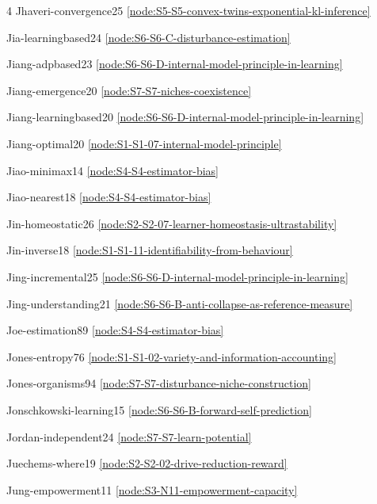 \documentclass[10pt]{article}
\begin{document}
{\begin{multicols}{4}
Jhaveri-convergence25 \hfill \ref{node:S5-S5-convex-twins-exponential-kl-inference}\par
Jia-learningbased24 \hfill \ref{node:S6-S6-C-disturbance-estimation}\par
Jiang-adpbased23 \hfill \ref{node:S6-S6-D-internal-model-principle-in-learning}\par
Jiang-emergence20 \hfill \ref{node:S7-S7-niches-coexistence}\par
Jiang-learningbased20 \hfill \ref{node:S6-S6-D-internal-model-principle-in-learning}\par
Jiang-optimal20 \hfill \ref{node:S1-S1-07-internal-model-principle}\par
Jiao-minimax14 \hfill \ref{node:S4-S4-estimator-bias}\par
Jiao-nearest18 \hfill \ref{node:S4-S4-estimator-bias}\par
Jin-homeostatic26 \hfill \ref{node:S2-S2-07-learner-homeostasis-ultrastability}\par
Jin-inverse18 \hfill \ref{node:S1-S1-11-identifiability-from-behaviour}\par
Jing-incremental25 \hfill \ref{node:S6-S6-D-internal-model-principle-in-learning}\par
Jing-understanding21 \hfill \ref{node:S6-S6-B-anti-collapse-as-reference-measure}\par
Joe-estimation89 \hfill \ref{node:S4-S4-estimator-bias}\par
Jones-entropy76 \hfill \ref{node:S1-S1-02-variety-and-information-accounting}\par
Jones-organisms94 \hfill \ref{node:S7-S7-disturbance-niche-construction}\par
Jonschkowski-learning15 \hfill \ref{node:S6-S6-B-forward-self-prediction}\par
Jordan-independent24 \hfill \ref{node:S7-S7-learn-potential}\par
Juechems-where19 \hfill \ref{node:S2-S2-02-drive-reduction-reward}\par
Jung-empowerment11 \hfill \ref{node:S3-N11-empowerment-capacity}\par


\end{multicols}}
\end{document}
